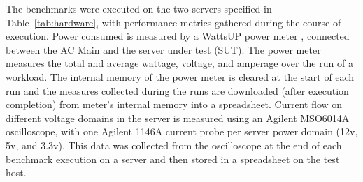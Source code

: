 \documentclass[prodmode,acmtaco,pdftex]{acmsmall}
\begin{document}
The benchmarks were executed on the two servers specified in
Table~\ref{tab:hardware}, with performance metrics gathered during the
course of execution.  Power consumed is measured by a WattsUP power meter
\cite{WattsUp2006a}, connected between the AC Main and the server under
test (SUT).  The power meter measures the total and average wattage,
voltage, and amperage over the run of a workload.  The internal memory
of the power meter is cleared at the start of each run and the measures
collected during the runs are downloaded (after execution completion)
from meter's internal memory into a spreadsheet.  Current flow on
different voltage domains in the server is measured using an Agilent
MSO6014A oscilloscope, with one Agilent 1146A current probe per server
power domain (12v, 5v, and 3.3v).  This data was collected from the
oscilloscope at the end of each benchmark execution on a server and then
stored in a spreadsheet on the test host.
\end{document}
